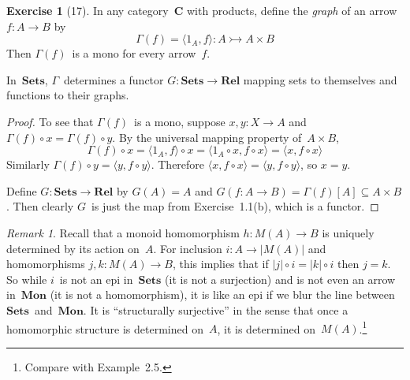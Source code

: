 \documentclass[letterpaper,12pt]{article}
\newcommand{\mono}{\rightarrowtail}
\newcommand{\after}{\circ}
\newcommand{\pair}[2]{\langle{#1},{#2}\rangle}
\newcommand{\cat}[1]{\mathbf{#1}}
\newcommand{\under}[1]{|{#1}|}
\newcommand{\C}{\cat{C}}
\newcommand{\Rel}{\cat{Rel}}
\newcommand{\Sets}{\cat{Sets}}
\newcommand{\Mon}{\cat{Mon}}
\theoremstyle{definition}
\newtheorem*{exer}{Exercise}
\theoremstyle{remark}
\newtheorem*{rmk}{Remark}
\theoremstyle{direction}
\begin{document}
\begin{exer}[17]
In any category~\(\C\) with products, define the \emph{graph} of an arrow \(f:A\to B\) by
\[\Gamma(f)=\pair{1_A}{f}:A\mono A\times B\]
Then \(\Gamma(f)\)~is a mono for every arrow~\(f\).

In~\(\Sets\), \(\Gamma\)~determines a functor \(G:\Sets\to\Rel\) mapping sets to themselves and functions to their graphs.
\end{exer}
\begin{proof}
To see that \(\Gamma(f)\)~is a mono, suppose \(x,y:X\to A\) and \(\Gamma(f)\after x=\Gamma(f)\after y\). By the universal mapping property of~\(A\times B\),
\[\Gamma(f)\after x=\pair{1_A}{f}\after x=\pair{1_A\after x}{f\after x}=\pair{x}{f\after x}\]
Similarly \(\Gamma(f)\after y=\pair{y}{f\after y}\). Therefore \(\pair{x}{f\after x}=\pair{y}{f\after y}\), so \(x=y\).

Define \(G:\Sets\to\Rel\) by \(G(A)=A\) and \(G(f:A\to B)=\Gamma(f)[A]\subseteq A\times B\). Then clearly \(G\)~is just the map from Exercise~1.1(b), which is a functor.
\end{proof}

\begin{rmk}
Recall that a monoid homomorphism \(h:M(A)\to B\) is uniquely determined by its action on~\(A\). For inclusion \(i:A\to\under{M(A)}\) and homomorphisms \(j,k:M(A)\to B\), this implies that if \(\under{j}\after i=\under{k}\after i\) then \(j=k\). So while \(i\)~is not an epi in~\(\Sets\) (it is not a surjection) and is not even an arrow in~\(\Mon\) (it is not a homomorphism), it is like an epi if we blur the line between \(\Sets\)~and~\(\Mon\). It is ``structurally surjective'' in the sense that once a homomorphic structure is determined on~\(A\), it is determined on~\(M(A)\).\footnote{Compare with Example~2.5.}
\end{rmk}
\end{document}

